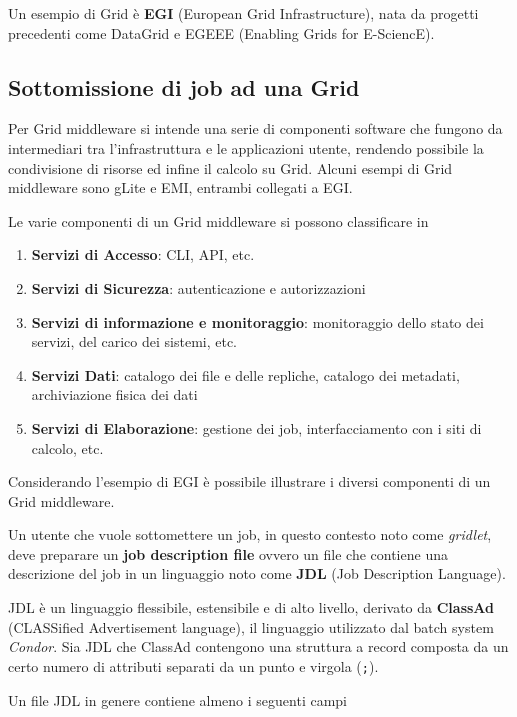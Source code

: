 \documentclass[italian,]{article}
\providecommand{\tightlist}{%
  \setlength{\itemsep}{0pt}\setlength{\parskip}{0pt}}
\begin{document}
Un esempio di Grid è \textbf{EGI} (European Grid Infrastructure), nata
da progetti precedenti come DataGrid e EGEEE (Enabling Grids for
E-SciencE).

\subsection{Sottomissione di job ad una
Grid}\label{sottomissione-di-job-ad-una-grid}

Per Grid middleware si intende una serie di componenti software che
fungono da intermediari tra l'infrastruttura e le applicazioni utente,
rendendo possibile la condivisione di risorse ed infine il calcolo su
Grid. Alcuni esempi di Grid middleware sono gLite e EMI, entrambi
collegati a EGI.

Le varie componenti di un Grid middleware si possono classificare in

\begin{enumerate}
\def\labelenumi{\arabic{enumi}.}
\tightlist
\item
  \textbf{Servizi di Accesso}: CLI, API, etc.
\item
  \textbf{Servizi di Sicurezza}: autenticazione e autorizzazioni
\item
  \textbf{Servizi di informazione e monitoraggio}: monitoraggio dello
  stato dei servizi, del carico dei sistemi, etc.
\item
  \textbf{Servizi Dati}: catalogo dei file e delle repliche, catalogo
  dei metadati, archiviazione fisica dei dati
\item
  \textbf{Servizi di Elaborazione}: gestione dei job, interfacciamento
  con i siti di calcolo, etc.
\end{enumerate}

Considerando l'esempio di EGI è possibile illustrare i diversi
componenti di un Grid middleware.

Un utente che vuole sottomettere un job, in questo contesto noto come
\emph{gridlet}, deve preparare un \textbf{job description file} ovvero
un file che contiene una descrizione del job in un linguaggio noto come
\textbf{JDL} (Job Description Language).

JDL è un linguaggio flessibile, estensibile e di alto livello, derivato
da \textbf{ClassAd} (CLASSified Advertisement language), il linguaggio
utilizzato dal batch system \emph{Condor}. Sia JDL che ClassAd
contengono una struttura a record composta da un certo numero di
attributi separati da un punto e virgola (\texttt{;}).

Un file JDL in genere contiene almeno i seguenti campi
\end{document}
